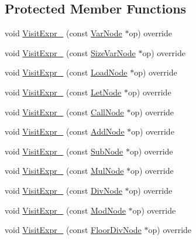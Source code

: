 \subsection*{Protected Member Functions}
\begin{DoxyCompactItemize}
\item 
void \hyperlink{classtvm_1_1tir_1_1ExprVisitor_abf1ea11bdeb9df050bc73155ffb50a8a}{Visit\+Expr\+\_\+} (const \hyperlink{classtvm_1_1tir_1_1VarNode}{Var\+Node} $\ast$op) override
\item 
void \hyperlink{classtvm_1_1tir_1_1ExprVisitor_a786dcfcef511795b23359a3c60c74477}{Visit\+Expr\+\_\+} (const \hyperlink{classtvm_1_1tir_1_1SizeVarNode}{Size\+Var\+Node} $\ast$op) override
\item 
void \hyperlink{classtvm_1_1tir_1_1ExprVisitor_ace23e526c5e9ca01910d5f3f1511725b}{Visit\+Expr\+\_\+} (const \hyperlink{classtvm_1_1tir_1_1LoadNode}{Load\+Node} $\ast$op) override
\item 
void \hyperlink{classtvm_1_1tir_1_1ExprVisitor_a206c594717e000028659b4868308ec0b}{Visit\+Expr\+\_\+} (const \hyperlink{classtvm_1_1tir_1_1LetNode}{Let\+Node} $\ast$op) override
\item 
void \hyperlink{classtvm_1_1tir_1_1ExprVisitor_ac2c3101c3ffbd53be46e46e0c0bb20fb}{Visit\+Expr\+\_\+} (const \hyperlink{classtvm_1_1tir_1_1CallNode}{Call\+Node} $\ast$op) override
\item 
void \hyperlink{classtvm_1_1tir_1_1ExprVisitor_ac15b2305024fcd9fa750350bb51de349}{Visit\+Expr\+\_\+} (const \hyperlink{classtvm_1_1tir_1_1AddNode}{Add\+Node} $\ast$op) override
\item 
void \hyperlink{classtvm_1_1tir_1_1ExprVisitor_a4eb35442748bfdb4872cccc760423efe}{Visit\+Expr\+\_\+} (const \hyperlink{classtvm_1_1tir_1_1SubNode}{Sub\+Node} $\ast$op) override
\item 
void \hyperlink{classtvm_1_1tir_1_1ExprVisitor_a3514ac6030929c1eab616bccb0da37ad}{Visit\+Expr\+\_\+} (const \hyperlink{classtvm_1_1tir_1_1MulNode}{Mul\+Node} $\ast$op) override
\item 
void \hyperlink{classtvm_1_1tir_1_1ExprVisitor_a3c91bf7900710da018179935ec40e837}{Visit\+Expr\+\_\+} (const \hyperlink{classtvm_1_1tir_1_1DivNode}{Div\+Node} $\ast$op) override
\item 
void \hyperlink{classtvm_1_1tir_1_1ExprVisitor_a3a28d6962c00847a9aa392d6092e44be}{Visit\+Expr\+\_\+} (const \hyperlink{classtvm_1_1tir_1_1ModNode}{Mod\+Node} $\ast$op) override
\item 
void \hyperlink{classtvm_1_1tir_1_1ExprVisitor_a600ab7a202c9351d0ce5698a0f884453}{Visit\+Expr\+\_\+} (const \hyperlink{classtvm_1_1tir_1_1FloorDivNode}{Floor\+Div\+Node} $\ast$op) override

\end{DoxyCompactItemize}
